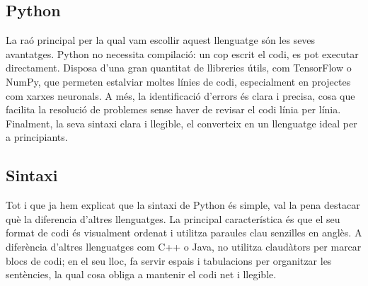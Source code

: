 \subsection{Python}
La raó principal per la qual vam escollir aquest llenguatge són les seves avantatges. Python no necessita compilació: un cop escrit el codi, es pot executar directament. Disposa d’una gran quantitat de llibreries útils, com TensorFlow o NumPy, que permeten estalviar moltes línies de codi, especialment en projectes com xarxes neuronals. A més, la identificació d’errors és clara i precisa, cosa que facilita la resolució de problemes sense haver de revisar el codi línia per línia. Finalment, la seva sintaxi clara i llegible, el converteix en un llenguatge ideal per a principiants.\\
\subsection{Sintaxi}
Tot i que ja hem explicat que la sintaxi de Python és simple, val la pena destacar què la diferencia d’altres llenguatges. La principal característica és que el seu format de codi és visualment ordenat i utilitza paraules clau senzilles en anglès. A diferència d’altres llenguatges com C++ o Java, no utilitza claudàtors per marcar blocs de codi; en el seu lloc, fa servir espais i tabulacions per organitzar les sentències, la qual cosa obliga a mantenir el codi net i llegible.

